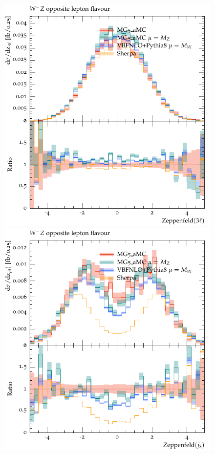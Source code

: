 \begin{figure}[htbp]
\begin{center}
   \includegraphics[scale=0.65]{figs/WmZ_OF_zep3l}
   \includegraphics[scale=0.65]{figs/WmZ_OF_zepj3}

\end{center}
\end{figure}
